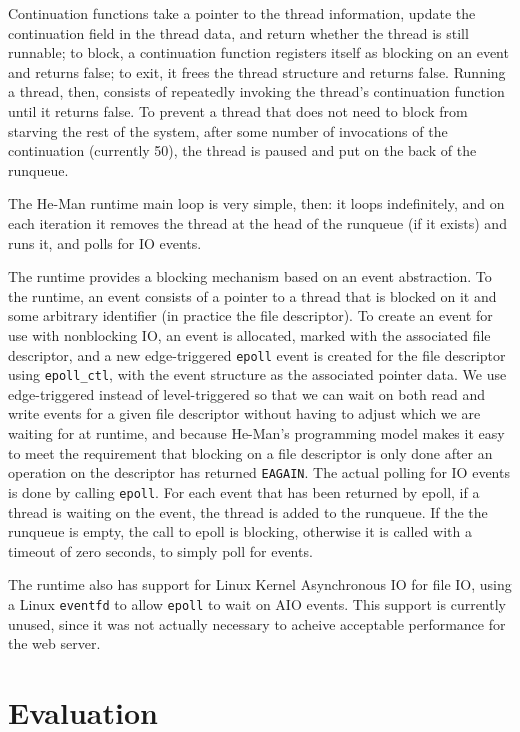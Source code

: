 \documentclass[preprint,11pt]{sigplanconf}
\renewcommand{\t}{\texttt}
\begin{document}
Continuation functions take a pointer to the thread information,
update the continuation field in the thread data, and return whether
the thread is still runnable; to block, a continuation function
registers itself as blocking on an event and returns false; to exit,
it frees the thread structure and returns false.
Running a thread, then, consists of repeatedly invoking the thread's
continuation function until it returns false. To prevent a
thread that does not need to block from starving the rest of the
system, after some number of invocations of the continuation
(currently 50), the thread is paused and put on the back of the
runqueue.

The He-Man runtime main loop is very simple, then: it loops
indefinitely, and on each iteration it removes the thread at the head
of the runqueue (if it exists) and runs it, and polls for IO events.

The runtime provides a blocking mechanism based on an event
abstraction. To the runtime, an event consists of a pointer to a
thread that is blocked on it and some arbitrary identifier (in
practice the file descriptor). To create an event for use with
nonblocking IO, an event is allocated, marked with the associated file
descriptor, and a new edge-triggered \t{epoll} event is created for the
file descriptor using \t{epoll\_ctl}, with the event structure as the
associated pointer data.
We use edge-triggered instead of level-triggered so that we can wait
on both read and write events for a given file descriptor without
having to adjust which we are waiting for at runtime, and because
He-Man's programming model makes it easy to meet the requirement that
blocking on a file descriptor is only done after an operation on the
descriptor has returned \t{EAGAIN}.
The actual polling for IO events is done by calling \t{epoll}. For each
event that has been returned by epoll, if a thread is waiting on the
event, the thread is added to the runqueue. If the the runqueue is
empty, the call to epoll is blocking, otherwise it is called with a
timeout of zero seconds, to simply poll for events.

The runtime also has support for Linux Kernel Asynchronous IO for file
IO, using a Linux \t{eventfd} to allow \t{epoll} to wait on AIO
events. This support is currently unused, since it was not actually
necessary to acheive acceptable performance for the web server.

\section{Evaluation}\label{sec:evaluation}
\end{document}
